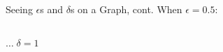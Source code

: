 \documentclass[Cal1Spr16Lectures.tex]{subfiles}
\begin{document}
\begin{frame}{\small Seeing $\epsilon$s and $\delta$s on a Graph, cont.}\footnotesize
When $\epsilon=0.5$:
\vspace{-0.25pc}
\begin{columns}
\begin{column}{.36\textwidth}
\begin{block}
\end{block}
\end{column}
\begin{column}{.36\textwidth}
\begin{block}
\end{block}
\end{column}
\end{columns}
\vspace{-0.75pc}
\flushright $\dots\;\delta=1$
\end{frame}
\end{document}
